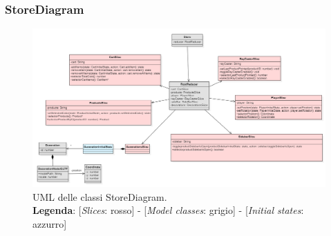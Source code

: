 \begin{landscape}
\thispagestyle{empty}
\subsubsection{StoreDiagram}
\begin{figure}[H]
	\centering
	\includegraphics[scale=0.7, keepaspectratio]{./res/images/StoreDiagram.PNG}
	\caption[UML delle classi StoreDiagram]{
	UML delle classi StoreDiagram.
	\\
	\textbf{Legenda}: 
	[\textit{Slices}: rosso] -
	[\textit{Model classes}: grigio] -
	[\textit{Initial states}: azzurro]}
\end{figure}
\end{landscape}
\restoregeometry
